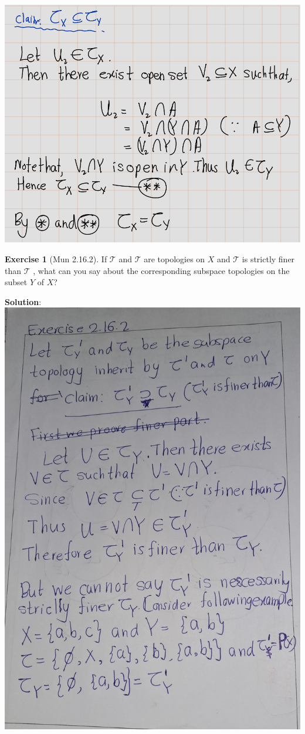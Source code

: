 \documentclass[
]{book}
\theoremstyle{definition}
\theoremstyle{definition}
\theoremstyle{definition}
\newtheorem{exercise}{Exercise}[chapter]
\theoremstyle{definition}
\theoremstyle{remark}
\begin{document}
\includegraphics{figures/Exercises/Ex 2.16/ex1-2.png}

\begin{exercise}[Mun 2.16.2]
\protect\hypertarget{exr:unnamed-chunk-84}{}\label{exr:unnamed-chunk-84}If \(\mathcal{T}\) and \(\mathcal{T}\) are topologies on \(X\) and \(\mathcal{T}\) is strictly finer than \(\mathcal{T}\) , what can you
say about the corresponding subspace topologies on the subset \(Y\) of \(X\)?
\end{exercise}

\textbf{Solution}:
\includegraphics{figures/Exercises/Ex 2.16/ex 2.jpg}
\end{document}
